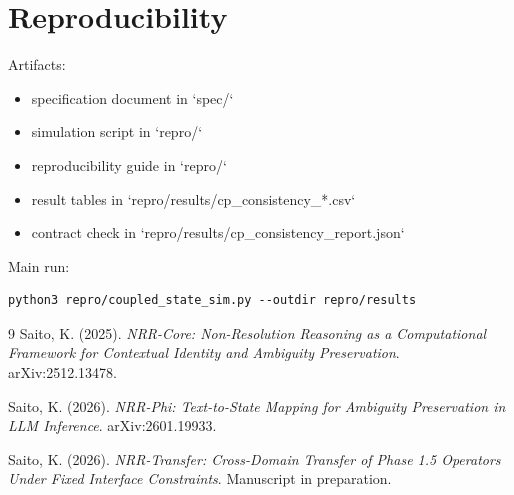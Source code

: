 \documentclass[11pt,a4paper]{article}
\begin{document}
\section{Reproducibility}
\label{sec:reproducibility}
Artifacts:
\begin{itemize}
  \item specification document in `spec/`
  \item simulation script in `repro/`
  \item reproducibility guide in `repro/`
  \item result tables in `repro/results/cp\_consistency\_*.csv`
  \item contract check in `repro/results/cp\_consistency\_report.json`
\end{itemize}

Main run:
\begin{lstlisting}
python3 repro/coupled_state_sim.py --outdir repro/results
\end{lstlisting}

\begin{thebibliography}{9}
Saito, K. (2025).
\textit{NRR-Core: Non-Resolution Reasoning as a Computational Framework for Contextual Identity and Ambiguity Preservation}.
arXiv:2512.13478.

Saito, K. (2026).
\textit{NRR-Phi: Text-to-State Mapping for Ambiguity Preservation in LLM Inference}.
arXiv:2601.19933.

Saito, K. (2026).
\textit{NRR-Transfer: Cross-Domain Transfer of Phase 1.5 Operators Under Fixed Interface Constraints}.
Manuscript in preparation.
\end{thebibliography}
\end{document}

